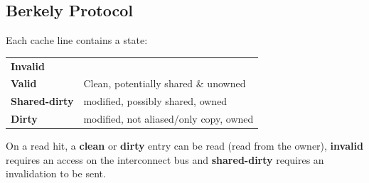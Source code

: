 \subsection{Berkely Protocol}
Each cache line contains a state:
\begin{center}
    \begin{tabular}{l p{}}
        \textbf{Invalid} \\
        \textbf{Valid} & Clean, potentially shared \& unowned \\
        \textbf{Shared-dirty} & modified, possibly shared, owned \\
        \textbf{Dirty} & modified, not aliased/only copy, owned \\
    \end{tabular}
\end{center}

On a read hit, a \textbf{clean} or \textbf{dirty} entry can be read (read from the owner), \textbf{invalid} requires an access on the interconnect bus and \textbf{shared-dirty} requires an invalidation to be sent.

